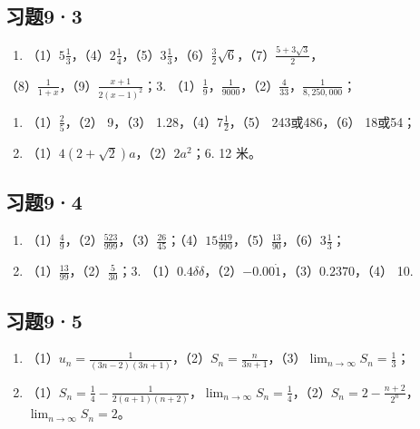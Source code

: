 \subsection{习题9·3}

\begin{enumerate}[start=2]
\item
  （1）\(5\frac{1}{3}\)，（4）\(2\frac{1}{4}\)，（5）\(3\frac{1}{3}\)，（6）\(\frac{3}{2}\sqrt{6}\)，（7）\(\frac{5 + 3\sqrt{3}}{2}\)，
\end{enumerate}

（8）\(\frac{1}{1 + x}\)，（9）\(\frac{x + 1}{2(x - 1)^2}\)；3.
（1）\(\frac{1}{9}\)，\(\frac{1}{9000}\)，（2）\(\frac{4}{33}\)，\(\frac{1}{8,250,000}\)；

\begin{enumerate}[start=4]
\item
  （1）\(\frac{2}{5}\)，（2） 9，（3）
  1.28，（4）\(7\frac{1}{2}\)，（5） 243或486，（6） 18或54；
\item
  （1）\(4(2 + \sqrt{2})a\)，（2）\(2a^2\)；6. 12 米。
\end{enumerate}

\subsection{习题9·4}

\begin{enumerate}
\item
  （1）\(\frac{4}{9}\)，（2）\(\frac{523}{999}\)，（3）\(\frac{26}{45}\)；（4）\(15\frac{419}{990}\)，（5）\(\frac{13}{90}\)，（6）\(3\frac{1}{3}\)；
\item
  （1）\(\frac{13}{99}\)，（2）\(\frac{5}{30}\)；3.
  （1）\(0.4\delta \delta\)，（2）\(-0.00\dot{1}\)，（3）\(0.2370\)，（4）
  10.
\end{enumerate}

\subsection{习题9·5}

\begin{enumerate}
\item
  （1）\(u_{n} = \frac{1}{(3n - 2)(3n + 1)}\)，（2）\(S_{n} = \frac{n}{3n + 1}\)，（3）\(\lim_{n\to \infty}S_n = \frac{1}{3}\)；
\item
  （1）\(S_{n} = \frac{1}{4} - \frac{1}{2(a + 1)(n + 2)}\)，\(\lim_{n\to \infty}S_n = \frac{1}{4}\)，（2）\(S_{n} = 2 - \frac{n + 2}{2^{n}}\)，\(\lim_{n\to \infty}S_{n} = 2\)。
\end{enumerate}

